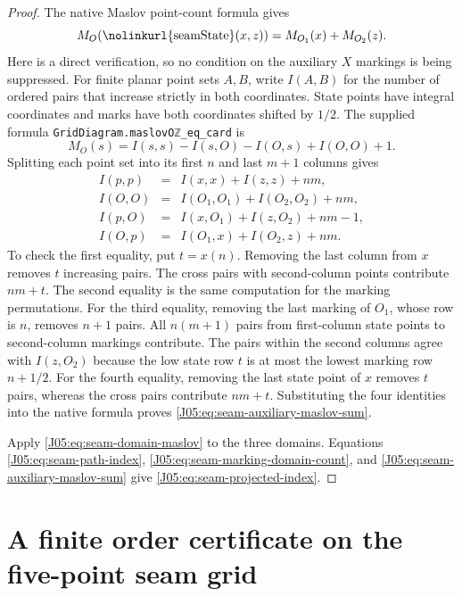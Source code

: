 \documentclass[11pt,oneside]{report}
\theoremstyle{definition}
\numberwithin{equation}{section}
\newcommand{\decl}[1]{\textnormal{\nolinkurl{#1}}}
\begin{document}
\begin{proof}
The native Maslov point-count formula gives
\begin{equation}\label{J05:eq:seam-auxiliary-maslov-sum}
 M_O(\decl{seamState}(x,z))=M_{O_1}(x)+M_{O_2}(z).
\end{equation}
Here is a direct verification, so no condition on the auxiliary
$X$ markings is being suppressed. For finite planar point sets $A,B$,
write $I(A,B)$ for the number of ordered pairs that increase strictly
in both coordinates. State points have integral coordinates and marks
have both coordinates shifted by $1/2$. The supplied formula
\decl{GridDiagram.maslovOℤ_eq_card} is
\[
 M_O(s)=I(s,s)-I(s,O)-I(O,s)+I(O,O)+1.
\]
Splitting each point set into its first $n$ and last $m+1$ columns gives
\[
\begin{array}{rcl}
 I(p,p)&=&I(x,x)+I(z,z)+nm,\\
 I(O,O)&=&I(O_1,O_1)+I(O_2,O_2)+nm,\\
 I(p,O)&=&I(x,O_1)+I(z,O_2)+nm-1,\\
 I(O,p)&=&I(O_1,x)+I(O_2,z)+nm.
\end{array}
\]
To check the first equality, put $t=x(n)$. Removing the last column
from $x$ removes $t$ increasing pairs. The cross pairs with second-column
points contribute $nm+t$. The second equality is the same computation
for the marking permutations.
For the third equality, removing the last marking of $O_1$, whose row
is $n$, removes $n+1$ pairs. All $n(m+1)$ pairs from first-column state
points to second-column markings contribute. The pairs within the second
columns agree with $I(z,O_2)$ because the low state row $t$ is at most
the lowest marking row $n+1/2$.
For the fourth equality, removing the last state point of $x$ removes
$t$ pairs, whereas the cross pairs contribute $nm+t$.
Substituting the four identities into the native formula proves
\eqref{J05:eq:seam-auxiliary-maslov-sum}.

Apply \eqref{J05:eq:seam-domain-maslov} to the three domains. Equations
\eqref{J05:eq:seam-path-index}, \eqref{J05:eq:seam-marking-domain-count}, and
\eqref{J05:eq:seam-auxiliary-maslov-sum} give
\eqref{J05:eq:seam-projected-index}.
\end{proof}


\section{A finite order certificate on the five-point seam grid}
\end{document}
